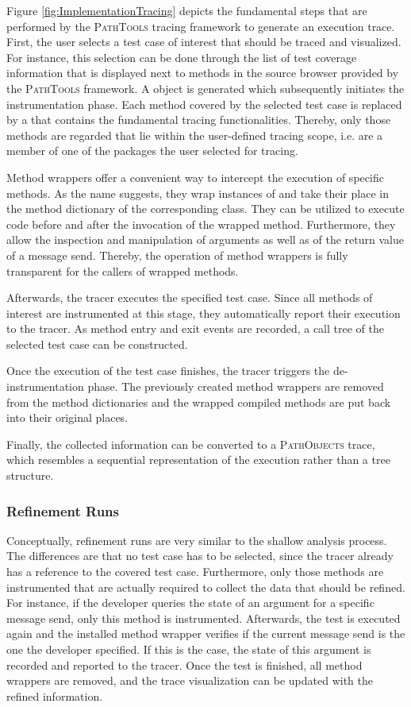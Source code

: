 Figure \ref{fig:ImplementationTracing} depicts the fundamental steps that are performed by the \textsc{PathTools} tracing framework to generate an execution trace.
First, the user selects a test case of interest that should be traced and visualized.
For instance, this selection can be done through the list of test coverage information that is displayed next to methods in the source browser provided by the \textsc{PathTools} framework.
A  object is generated which subsequently initiates the instrumentation phase.
Each method covered by the selected test case is replaced by a  that contains the fundamental tracing functionalities.
Thereby, only those methods are regarded that lie within the user-defined tracing scope, i.e. are a member of one of the packages the user selected for tracing.

Method wrappers \cite{brant_wrappers_1998} offer a convenient way to intercept the execution of specific methods.
As the name suggests, they wrap instances of  and take their place in the method dictionary of the corresponding class.
They can be utilized to execute code before and after the invocation of the wrapped method.
Furthermore, they allow the inspection and manipulation of arguments as well as of the return value of a message send.
Thereby, the operation of method wrappers is fully transparent for the callers of wrapped methods.

Afterwards, the tracer executes the specified test case.
Since all methods of interest are instrumented at this stage, they automatically report their execution to the tracer.
As method entry and exit events are recorded, a call tree of the selected test case can be constructed.

Once the execution of the test case finishes, the tracer triggers the de-instrumentation phase.
The previously created method wrappers are removed from the method dictionaries and the wrapped compiled methods are put back into their original places.

Finally, the collected information can be converted to a \textsc{PathObjects} trace, which resembles a sequential representation of the execution rather than a tree structure.

\subsubsection{Refinement Runs}
Conceptually, refinement runs are very similar to the shallow analysis process.
The differences are that no test case has to be selected, since the tracer already has a reference to the covered test case.
Furthermore, only those methods are instrumented that are actually required to collect the data that should be refined.
For instance, if the developer queries the state of an argument for a specific message send, only this method is instrumented.
Afterwards, the test is executed again and the installed method wrapper verifies if the current message send is the one the developer specified.
If this is the case, the state of this argument is recorded and reported to the tracer.
Once the test is finished, all method wrappers are removed, and the trace visualization can be updated with the refined information.

